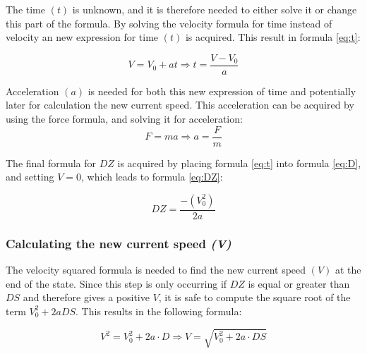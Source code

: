 \documentclass[noprint]{uit-thesis}
\begin{document}
The time $(t)$ is unknown, and it is therefore needed to either solve it or change this part of the formula. By solving the velocity formula for time instead of velocity an new expression for time $(t)$ is acquired. This result in formula \ref{eq:t}:

\begin{equation}
\label{eq:t}
V = V_0 + at \Rightarrow t = \frac{V - V_0}{a}
\end{equation}

Acceleration $(a)$ is needed for both this new expression of time and potentially later for calculation the new current speed. This acceleration can be acquired by using the force formula, and solving it for acceleration:
\begin{equation}
\label{eq:a}
F = ma \Rightarrow a = \frac{F}{m}
\end{equation}

The final formula for $DZ$ is acquired by placing formula \ref{eq:t} into formula \ref{eq:D}, and setting $V = 0$, which leads to formula \ref{eq:DZ}:

\begin{equation}
\label{eq:DZ}
DZ = \frac{- (V_0^2)}{2a}
\end{equation}


\subsubsection{Calculating the new current speed \textit{(V)}}
The velocity squared formula is needed to find the new current speed $(V)$ at the end of the state. Since this step is only occurring if $DZ$ is equal or greater than $DS$ and therefore gives a positive $V$, it is safe to compute the square root of the term $V_0^2 + 2a DS$. This results in the following formula:

\begin{equation}
\label{eq:V}
V^2=V_0^2 + 2a \cdot D \Rightarrow V=\sqrt{V_0^2 + 2 a \cdot DS}
\end{equation}
\end{document}
